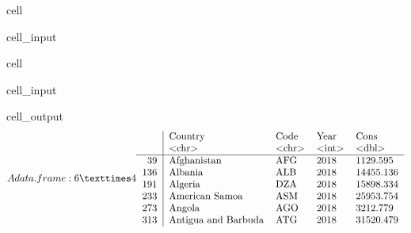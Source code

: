 \documentclass[letterpaper,10pt,english]{jupyterBook}
\begin{document}
\begin{sphinxuseclass}{cell}\begin{sphinxVerbatimInput}

\begin{sphinxuseclass}{cell_input}
\begin{sphinxVerbatim}[commandchars=\\\{\}]
\end{sphinxVerbatim}

\end{sphinxuseclass}\end{sphinxVerbatimInput}

\end{sphinxuseclass}
\begin{sphinxuseclass}{cell}\begin{sphinxVerbatimInput}

\begin{sphinxuseclass}{cell_input}
\begin{sphinxVerbatim}[commandchars=\\\{\}]
\PYG{p}{[}\PYG{p}{]}
\end{sphinxVerbatim}

\end{sphinxuseclass}\end{sphinxVerbatimInput}
\begin{sphinxVerbatimOutput}

\begin{sphinxuseclass}{cell_output}\begin{equation*}
\begin{split}A data.frame: 6 × 4
\begin{tabular}{r|llll}
  & Country & Code & Year & Cons\\
  & <chr> & <chr> & <int> & <dbl>\\
\hline
	39 & Afghanistan         & AFG & 2018 &  1129.595\\
	136 & Albania             & ALB & 2018 & 14455.136\\
	191 & Algeria             & DZA & 2018 & 15898.334\\
	233 & American Samoa      & ASM & 2018 & 25953.754\\
	273 & Angola              & AGO & 2018 &  3212.779\\
	313 & Antigua and Barbuda & ATG & 2018 & 31520.479\\
\end{tabular}\end{split}
\end{equation*}
\end{sphinxuseclass}\end{sphinxVerbatimOutput}

\end{sphinxuseclass}
\end{document}
